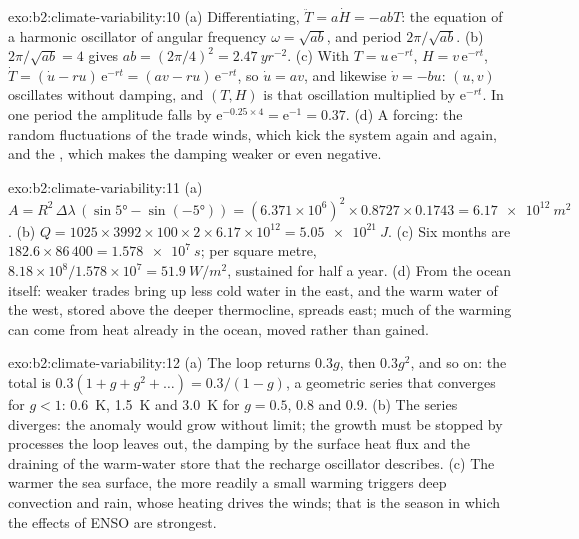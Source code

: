\begin{solution}{exo:b2:climate-variability:10}
(a) Differentiating, $\ddot T = a\dot H = -abT$: the equation of a harmonic oscillator of angular
frequency $\omega = \sqrt{ab}$, and period $2\pi/\sqrt{ab}$. (b) $2\pi/\sqrt{ab} = 4$ gives $ab =
(2\pi/4)^2 = \qty{2.47}{yr^{-2}}$. (c) With $T = u\,\mathrm{e}^{-rt}$, $H = v\,\mathrm{e}^{-rt}$,
$\dot T = (\dot u - ru)\,\mathrm{e}^{-rt} = (av - ru)\,\mathrm{e}^{-rt}$, so $\dot u = av$, and
likewise $\dot v = -bu$: $(u, v)$ oscillates without damping, and $(T, H)$ is that oscillation
multiplied by $\mathrm{e}^{-rt}$. In one period the amplitude falls by $\mathrm{e}^{-0.25 \times
4} = \mathrm{e}^{-1} = 0.37$. (d) A forcing: the random fluctuations of the trade winds, which
kick the system again and again, and the , which makes the damping weaker or
even negative.
\end{solution}

\begin{solution}{exo:b2:climate-variability:11}
(a) $A = R^2 \,\Delta\lambda\,(\sin\ang{5} - \sin(\ang{-5})) = (6.371 \times 10^6)^2 \times 0.8727
\times 0.1743 = \qty{6.17e12}{m^2}$. (b) $Q = 1025 \times 3992 \times 100 \times 2 \times 6.17
\times 10^{12} = \qty{5.05e21}{J}$. (c) Six months are $182.6 \times 86\,400 = \qty{1.578e7}{s}$;
per square metre, $8.18 \times 10^8/1.578 \times 10^7 = \qty{51.9}{W/m^2}$, sustained for half a
year. (d) From the ocean itself: weaker trades bring up less cold water in the east, and the warm
water of the west, stored above the deeper thermocline, spreads east; much of the warming
can come from heat already in the ocean, moved rather than gained.
\end{solution}

\begin{solution}{exo:b2:climate-variability:12}
(a) The loop returns $0.3g$, then $0.3g^2$, and so on: the total is $0.3(1 + g + g^2 + \dots) =
0.3/(1 - g)$, a geometric series that converges for $g < 1$: \qty{0.6}{K}, \qty{1.5}{K} and
\qty{3.0}{K} for $g = 0.5$, 0.8 and 0.9. (b) The series diverges: the anomaly would grow without
limit; the growth must be stopped by processes the loop leaves out, the damping by the surface
heat flux and the draining of the warm-water store that the recharge oscillator describes. (c)
The warmer the sea surface, the more readily a small warming triggers deep convection and rain,
whose heating drives the winds; that is the season in which the effects of ENSO are strongest.
\end{solution}

